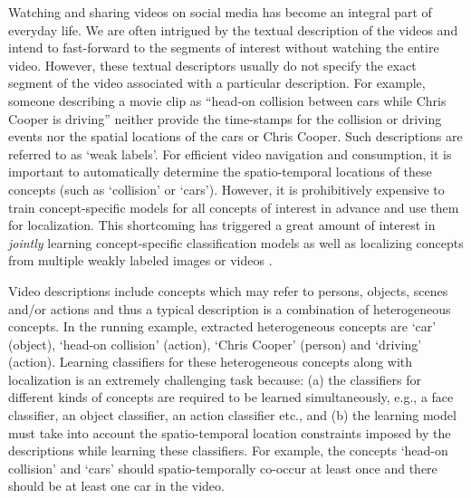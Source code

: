 \documentclass[runningheads]{llncs}
\begin{document}
Watching and sharing videos on social media has become an integral part of everyday life. We are often intrigued by the textual description of the videos and intend to fast-forward to the segments of interest without watching the entire video. However, these textual descriptors usually do not specify the exact segment of the video associated with a particular description. For example, someone describing a movie clip as ``head-on collision between cars while Chris Cooper is driving'' neither provide the time-stamps for the collision or driving events nor the spatial locations of the cars or Chris Cooper. Such descriptions are referred to as `weak labels'. For efficient video navigation and consumption, it is important to automatically determine the spatio-temporal locations of these concepts (such as `collision' or `cars'). However, it is prohibitively expensive to train concept-specific models for all concepts of interest in advance and use them for localization. 
This shortcoming has triggered a great amount of interest in \textit{jointly} learning concept-specific classification models as well as localizing concepts from multiple weakly labeled images \cite{shi2014weakly,leung2011handling,Oquab15} or videos \cite{bojanowski2014weakly,bojanowski2013finding}.


Video descriptions include concepts which may refer to persons, objects, scenes and/or
actions and thus a typical description is a combination of heterogeneous concepts. In the running example, extracted heterogeneous concepts are `car' (object), `head-on collision' (action), `Chris Cooper' (person) and `driving' (action). Learning classifiers for these heterogeneous concepts along with localization is an extremely challenging task because: (a) the classifiers for different kinds of concepts are required to be learned simultaneously, e.g., a face classifier, an object classifier, an action classifier etc., and (b) the learning model must take into account the spatio-temporal location constraints imposed by the descriptions while learning these classifiers. For example, the concepts `head-on collision' and `cars' should spatio-temporally co-occur at least once and there should be at least one car in the video. 
\end{document}
